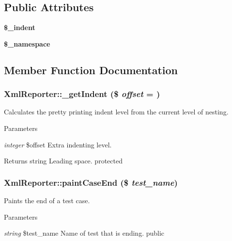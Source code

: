 \subsection*{Public Attributes}
\begin{DoxyCompactItemize}
\item 
\hypertarget{class_xml_reporter_a1a4462fc6c347d1a2d40f507cade17b1}{
{\bfseries \$\_\-indent}}
\label{class_xml_reporter_a1a4462fc6c347d1a2d40f507cade17b1}

\item 
\hypertarget{class_xml_reporter_ac3c0a87d9aac1a26e0865dbc5d6d629e}{
{\bfseries \$\_\-namespace}}
\label{class_xml_reporter_ac3c0a87d9aac1a26e0865dbc5d6d629e}

\end{DoxyCompactItemize}


\subsection{Member Function Documentation}
\hypertarget{class_xml_reporter_ab4a23bb48d3575347b0e5259e49a1b6f}{
\subsubsection[{\_\-getIndent}]{\setlength{\rightskip}{0pt plus 5cm}XmlReporter::\_\-getIndent (\$ {\em offset} = {})}}
\label{class_xml_reporter_ab4a23bb48d3575347b0e5259e49a1b6f}
Calculates the pretty printing indent level from the current level of nesting. 
\begin{DoxyParams}{Parameters}
\item[{\em integer}]\$offset Extra indenting level. \end{DoxyParams}
\begin{DoxyReturn}{Returns}
string Leading space.  protected 
\end{DoxyReturn}
\hypertarget{class_xml_reporter_a1d5e2bab9c6f61d49e65ec55e9a04015}{
\subsubsection[{paintCaseEnd}]{\setlength{\rightskip}{0pt plus 5cm}XmlReporter::paintCaseEnd (\$ {\em test\_\-name})}}
\label{class_xml_reporter_a1d5e2bab9c6f61d49e65ec55e9a04015}
Paints the end of a test case. 
\begin{DoxyParams}{Parameters}
\item[{\em string}]\$test\_\-name Name of test that is ending.  public \end{DoxyParams}


